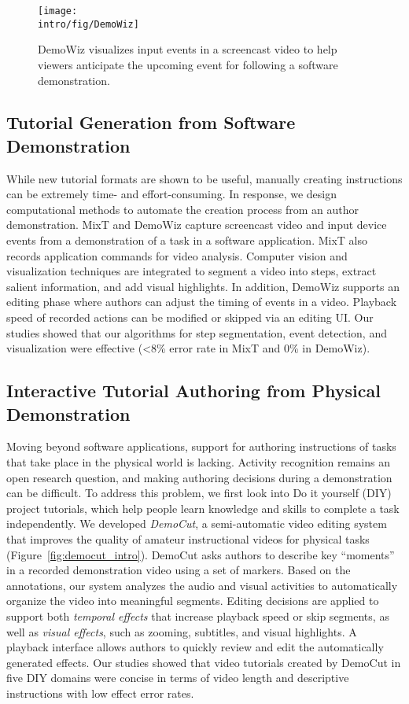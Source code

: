 \begin{figure*}[t]
\centering
\texttt{[image: \\intro/fig/DemoWiz]}
\caption{DemoWiz visualizes input events in a screencast video to help viewers anticipate the upcoming event for following a software demonstration.}
\label{fig:demowiz_intro}
\end{figure*}

\subsection{Tutorial Generation from Software Demonstration}

While new tutorial formats are shown to be useful, manually creating instructions can be extremely time- and effort-consuming. In response, we design computational methods to automate the creation process from an author demonstration. MixT and DemoWiz capture screencast video and input device events from a demonstration of a task in a software application. MixT also records application commands for video analysis. Computer vision and visualization techniques are integrated to segment a video into steps, extract salient information, and add visual highlights.
%
In addition, DemoWiz supports an editing phase where authors can adjust the timing of events in a video. Playback speed of recorded actions can be modified or skipped via an editing UI. Our studies showed that our algorithms for step segmentation, event detection, and visualization were effective (\textless8\% error rate in MixT and 0\% in DemoWiz).

\subsection{Interactive Tutorial Authoring from Physical Demonstration}


Moving beyond software applications, support for authoring instructions of tasks that take place in the physical world is lacking. Activity recognition remains an open research question, and making authoring decisions during a demonstration can be difficult.
%
To address this problem, we first look into Do it yourself (DIY) project tutorials, which help people learn knowledge and skills to complete a task independently.
%
We developed \emph{DemoCut}, a semi-automatic video editing system that improves the quality of amateur instructional videos for physical tasks (Figure~\ref{fig:democut_intro}). DemoCut asks authors to describe key ``moments'' in a recorded demonstration video using a set of markers. Based on the annotations, our system analyzes the audio and visual activities to automatically organize the video into meaningful segments. Editing decisions are applied to support both \emph{temporal effects} that increase playback speed or skip segments, as well as \emph{visual effects}, such as zooming, subtitles, and visual highlights. A playback interface allows authors to quickly review and edit the automatically generated effects.
%
Our studies showed that video tutorials created by DemoCut in five DIY domains were concise in terms of video length and descriptive instructions with low effect error rates.

